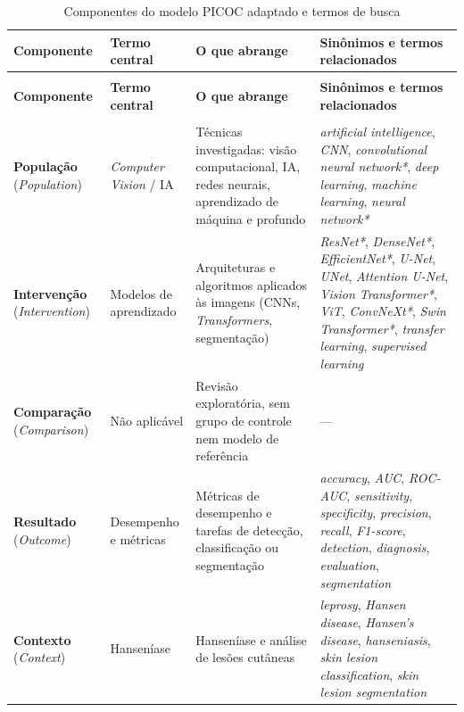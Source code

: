 \begingroup
\setlength{\tabcolsep}{4pt}
\begin{longtable}{|>{\footnotesize\raggedright\arraybackslash}p{2.5cm}|>{\footnotesize\raggedright\arraybackslash}p{2.0cm}|>{\footnotesize\raggedright\arraybackslash}p{4.5cm}|>{\footnotesize\raggedright\arraybackslash}p{5.8cm}|}
	\caption{Componentes do modelo PICOC adaptado e termos de busca}\label{tab:picoc-termos} \\
	\hline
	\textbf{Componente} & \textbf{Termo central} & \textbf{O que abrange} & \textbf{Sinônimos e termos relacionados} \\ \hline
	\endfirsthead
	\multicolumn{4}{l}{\footnotesize\textit{Tabela~\ref{tab:picoc-termos} (continuação)}} \\
	\hline
	\textbf{Componente} & \textbf{Termo central} & \textbf{O que abrange} & \textbf{Sinônimos e termos relacionados} \\ \hline
	\endhead
	\multicolumn{4}{r}{\footnotesize\textit{continua na próxima página}} \\
	\endfoot
	\endlastfoot
	\textbf{População} (\textit{Population}) & \textit{Computer Vision} / IA & Técnicas investigadas: visão computacional, IA, redes neurais, aprendizado de máquina e profundo & \textit{artificial intelligence}, \textit{CNN}, \textit{convolutional neural network*}, \textit{deep learning}, \textit{machine learning}, \textit{neural network*} \\ \hline
		\textbf{Intervenção} (\textit{Intervention}) & Modelos de aprendizado & Arquiteturas e algoritmos aplicados às imagens (CNNs, \textit{Transformers}, segmentação) & \textit{ResNet*}, \textit{DenseNet*}, \textit{EfficientNet*}, \textit{U-Net}, \textit{UNet}, \textit{Attention U-Net}, \textit{Vision Transformer*}, \textit{ViT}, \textit{ConvNeXt*}, \textit{Swin Transformer*}, \textit{transfer learning}, \textit{supervised learning} \\ \hline
		\textbf{Comparação} (\textit{Comparison}) & Não aplicável & Revisão exploratória, sem grupo de controle nem modelo de referência & --- \\ \hline
		\textbf{Resultado} (\textit{Outcome}) & Desempenho e métricas & Métricas de desempenho e tarefas de detecção, classificação ou segmentação & \textit{accuracy}, \textit{AUC}, \textit{ROC-AUC}, \textit{sensitivity}, \textit{specificity}, \textit{precision}, \textit{recall}, \textit{F1-score}, \textit{detection}, \textit{diagnosis}, \textit{evaluation}, \textit{segmentation} \\ \hline
		\textbf{Contexto} (\textit{Context}) & Hanseníase & Hanseníase e análise de lesões cutâneas & \textit{leprosy}, \textit{Hansen disease}, \textit{Hansen's disease}, \textit{hanseniasis}, \textit{skin lesion classification}, \textit{skin lesion segmentation} \\ \hline
\end{longtable}
\endgroup
{}

